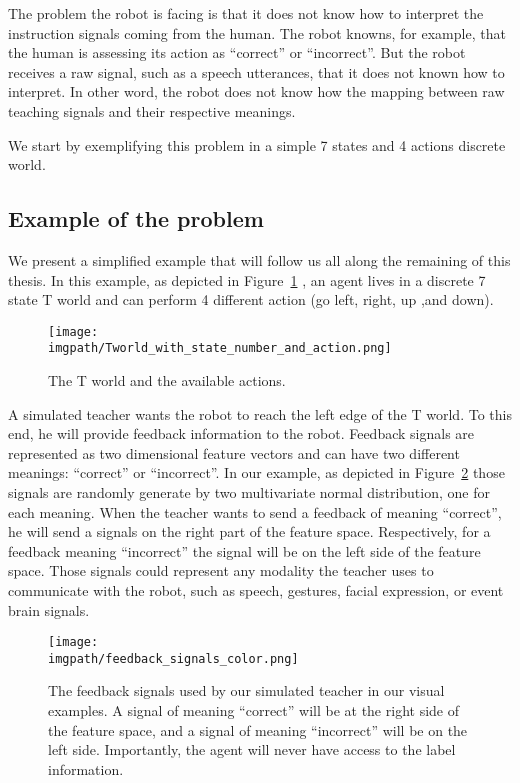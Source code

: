 The problem the robot is facing is that it does not know how to interpret the instruction signals coming from the human. The robot knowns, for example, that the human is assessing its action as ``correct'' or ``incorrect''. But the robot receives a raw signal, such as a speech utterances, that it does not known how to interpret. In other word, the robot does not know how the mapping between raw teaching signals and their respective meanings.

We start by exemplifying this problem in a simple 7 states and 4 actions discrete world.

\subsection{Example of the problem}
\label{chapter:lfui:example}

We present a simplified example that will follow us all along the remaining of this thesis. In this example, as depicted in Figure~\ref{fig:Tworld} , an agent lives in a discrete 7 state T world and can perform 4 different action (go left, right, up ,and down).

\begin{figure}[!ht]
  \centering
  \texttt{[image: \\imgpath/Tworld\_with\_state\_number\_and\_action.png]}
  \caption{The T world and the available actions.}
  \label{fig:Tworld}
\end{figure}

A simulated teacher wants the robot to reach the left edge of the T world. To this end, he will provide feedback information to the robot. Feedback signals are represented as two dimensional feature vectors and can have two different meanings: ``correct'' or ``incorrect''. In our example, as depicted in Figure~\ref{fig:feedbacksignals} those signals are randomly generate by two multivariate normal distribution, one for each meaning. When the teacher wants to send a feedback of meaning ``correct'', he will send a signals on the right part of the feature space. Respectively, for a feedback meaning ``incorrect'' the signal will be on the left side of the feature space. Those signals could represent any modality the teacher uses to communicate with the robot, such as speech, gestures, facial expression, or event brain signals. 

\begin{figure}[!ht]
  \centering
  \texttt{[image: \\imgpath/feedback\_signals\_color.png]}
  \caption{The feedback signals used by our simulated teacher in our visual examples. A signal of meaning ``correct'' will be at the right side of the feature space, and a signal of meaning ``incorrect'' will be on the left side. Importantly, the agent will never have access to the label information.}
  \label{fig:feedbacksignals}
\end{figure}

